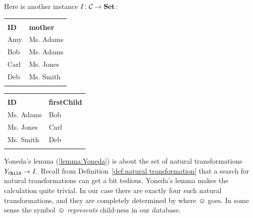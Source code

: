 \documentclass[CT4S-EN-RU]{subfiles}
\begin{document}
\begin{exampleENG}
Here is another instance $I\taking\mcC\to\Set$:
\begin{center}
\begin{tabular}{| l || l |}\bhline
\multicolumn{2}{|c|}{\tt Child}\\\bhline
{\bf ID}&{\bf mother}\\\hline
Amy&Ms. Adams\\\hline
Bob&Ms. Adams\\\hline
Carl&Ms. Jones\\\hline
Deb&Ms. Smith\\\bhline
\end{tabular}
\hsp
\begin{tabular}{| l || l |}\bhline
\multicolumn{2}{|c|}{\tt Mother}\\\bhline
{\bf ID}&{\bf firstChild}\\\bbhline
Ms. Adams&Bob\\\hline
Ms. Jones&Carl\\\hline
Ms. Smith&Deb\\\bhline
\end{tabular}
\end{center}
\end{exampleENG}

\begin{exampleRUS}\label{ex:yoneda}
\end{exampleRUS}

\begin{blockENG}
Yoneda's lemma (\ref{lemma:Yoneda}) is about the set of natural transformations $Y_{\tt Child}\to I.$ Recall from Definition~\ref{def:natural transformation} that a search for natural transformations can get a bit tedious. Yoneda's lemma makes the calculation quite trivial. In our case there are exactly four such natural transformations, and they are completely determined by where $\smiley$ goes. In some sense the symbol $\smiley$ {\em represents} child-ness in our database. 
\end{blockENG}

\begin{blockRUS}
\end{blockRUS}
\end{document}
